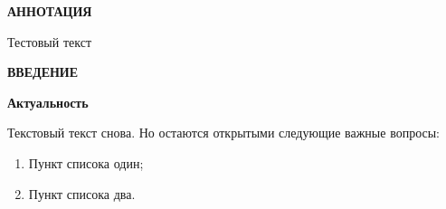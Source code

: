 \newpage
\begin{center}
  \textbf{\large АННОТАЦИЯ}
\end{center}

Тестовый текст

\onehalfspacing
\setcounter{page}{6}

\newpage
\renewcommand{\contentsname}{\centerline{\large СОДЕРЖАНИЕ}}
\tableofcontents

\newpage
\begin{center}
  \textbf{\large ВВЕДЕНИЕ}
\end{center}


\textbf{Актуальность}

Текстовый текст снова.
Но остаются открытыми следующие важные вопросы:
\begin{enumerate}
\item Пункт списока один;
\item Пункт списока два.
\end{enumerate}

